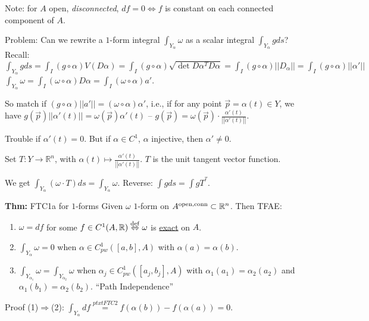 \documentclass[10pt,letterpaper]{article}
\newcommand{\n}{\hfill\break}
\newcommand{\thm}[1]{\par\noindent\settowidth{\hangindent}{\textbf{Thm: }}\textbf{Thm: }#1\n}
\newcommand{\ptxt}[1]{\textrm{\textnormal{#1}}}
\newcommand{\reals}{\mathbb{R}}
\newcommand{\R}{\reals}
\newcommand{\abs}[1]{\left|#1\right|}
\newcommand{\of}{\circ}
\newcommand{\norm}[1]{\abs{\abs{#1}}}
\newcommand{\tpose}{^{T}}
\begin{document}
\par\noindent Note: for $A$ open, \textit{disconnected}, $df=0\Leftrightarrow{}f$ is constant on each connected component of $A$.\n

\par\noindent Problem: Can we rewrite a $1$-form integral $\int_{Y_{\alpha}}\omega$ as a scalar integral $\int_{Y_{\alpha}}gds$?\n
Recall: $\displaystyle\int_{Y_{\alpha}}gds=\int_{I}(g\of\alpha)V(D\alpha)=\int_{I}(g\of\alpha)\sqrt{\det{}D\alpha\tpose{}D\alpha}=\int_{I}(g\of\alpha)\norm{D_{\alpha}}=\int_{I}(g\of\alpha)\norm{\alpha'}$\n
$\displaystyle\int_{Y_{\alpha}}\omega=\int_{I}(\omega\of\alpha)D\alpha=\int_{I}(\omega\of\alpha)a'$.\n

\par\noindent So match if $(g\of\alpha)\norm{a'}=(\omega\of\alpha)\alpha'$, i.e., if for any point $\vec{p}=\alpha(t)\in{}Y$, we have $g(\vec{p})\norm{\alpha'(t)}=\omega(\vec{p})\alpha'(t)$ -- $g(\vec{p})=\omega(\vec{p})\cdot\frac{\alpha'(t)}{\norm{\alpha'(t)}}$.\n

\par\noindent Trouble if $\alpha'(t)=0$. But if $\alpha\in{}C^{1}$, $\alpha$ injective, then $\alpha'\ne{}0$.\n

\par\noindent Set $T:Y\to\R^{n}$, with $\alpha(t)\mapsto\frac{\alpha'(t)}{\norm{\alpha'(t)}}$. $T$ is the unit tangent vector function.\n

\par\noindent We get $\displaystyle\int_{Y_{\alpha}}(\omega\cdot{}T)ds=\int_{Y_{\alpha}}\omega$. Reverse: $\displaystyle\int{}gds=\int{}gT^{\tpose}$.\n

\thm{FTC1a for $1$-forms\n
Given $\omega$ $1$-form on $A^{\ptxt{open},\ptxt{conn}}\subset\R^{n}$.\n
Then TFAE:\n
\begin{enumerate}[label=(\arabic*)]
	\item $\omega=df$ for some $f\in{}C^{1}(A,\R)\overset{\ptxt{def}}{\Leftrightarrow}\omega$ is \underline{exact} on $A$.
	\item $\int_{Y_{\alpha}}\omega=0$ when $\alpha\in{}C_{pw}^{1}([a,b],A)$ with $\alpha(a)=\alpha(b)$.
	\item $\int_{Y_{\alpha_{1}}}\omega=\int_{Y_{\alpha_{2}}}\omega$ when $\alpha_{j}\in{}C_{pw}^{1}([a_{j},b_{j}],A)$ with $\alpha_{1}(a_{1})=\alpha_{2}(a_{2})$ and $\alpha_{1}(b_{1})=\alpha_{2}(b_{2})$.\n
	``Path Independence''
\end{enumerate}}

\par\noindent Proof (1)$\Rightarrow$(2): $\int_{Y_{\alpha}}df\overset{ptxt{FTC2}}{=}f(\alpha(b))-f(\alpha(a))=0$.\n
\end{document}
